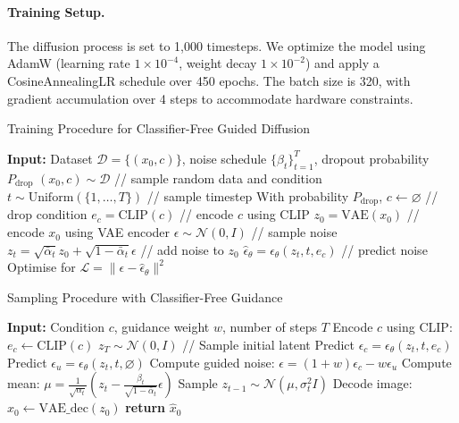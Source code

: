 \documentclass[11pt,a4paper]{article}
\begin{document}
\paragraph{Training Setup.} The diffusion process is set to 1,000 timesteps. We optimize the model using AdamW (learning rate $1\times10^{-4}$, weight decay $1\times10^{-2}$) and apply a CosineAnnealingLR schedule over 450 epochs. The batch size is 320, with gradient accumulation over 4 steps to accommodate hardware constraints.

\begin{algorithm}[htb]
\caption{Training Procedure for Classifier-Free Guided Diffusion}
\begin{algorithmic}[1]
  \STATE \textbf{Input:} Dataset $\mathcal{D} = \{(x_0, c)\}$, noise schedule $\{\beta_t\}_{t=1}^T$, dropout probability $P_{\mathrm{drop}}$
    \STATE $(x_0, c) \sim \mathcal{D}$ \hfill // sample random data and condition
    \STATE $t \sim \mathrm{Uniform}(\{1, \ldots, T\})$ \hfill // sample timestep
    \STATE With probability $P_{\mathrm{drop}}$, $c \leftarrow \varnothing$ \hfill // drop condition
    \STATE $e_c = \mathrm{CLIP}(c)$ \hfill // encode $c$ using CLIP
    \STATE $z_0 = \mathrm{VAE}(x_0)$ \hfill // encode $x_0$ using VAE encoder
    \STATE $\epsilon \sim \mathcal{N}(0, I)$ \hfill // sample noise
    \STATE $z_t = \sqrt{\bar{\alpha}_t} z_0 + \sqrt{1 - \bar{\alpha}_t} \epsilon$ \hfill // add noise to $z_0$
    \STATE $\hat{\epsilon}_\theta = \epsilon_\theta(z_t, t, e_c)$ \hfill // predict noise
    \STATE Optimise for $\mathcal{L} = \|\epsilon - \hat{\epsilon}_\theta\|^2$
  \ENDFOR
\end{algorithmic}
\end{algorithm}

\begin{algorithm}[htb]
\caption{Sampling Procedure with Classifier-Free Guidance}
\begin{algorithmic}[1]
  \STATE \textbf{Input:} Condition $c$, guidance weight $w$, number of steps $T$
  \STATE Encode $c$ using CLIP: $e_c \leftarrow \mathrm{CLIP}(c)$
  \STATE $z_T \sim \mathcal{N}(0, I)$ \hfill // Sample initial latent
    \STATE Predict $\epsilon_c = \epsilon_\theta(z_t, t, e_c)$
    \STATE Predict $\epsilon_u = \epsilon_\theta(z_t, t, \varnothing)$
    \STATE Compute guided noise: $\epsilon = (1 + w)\epsilon_c - w\epsilon_u$
    \STATE Compute mean: $\mu = \frac{1}{\sqrt{\alpha_t}} \left(z_t - \frac{\beta_t}{\sqrt{1 - \bar{\alpha}_t}} \epsilon \right)$
    \STATE Sample $z_{t-1} \sim \mathcal{N}(\mu, \sigma_t^2 I)$
  \ENDFOR
  \STATE Decode image: $\hat{x}_0 \leftarrow \mathrm{VAE\_dec}(z_0)$
  \STATE \textbf{return} $\hat{x}_0$
\end{algorithmic}
\end{algorithm}
\end{document}
